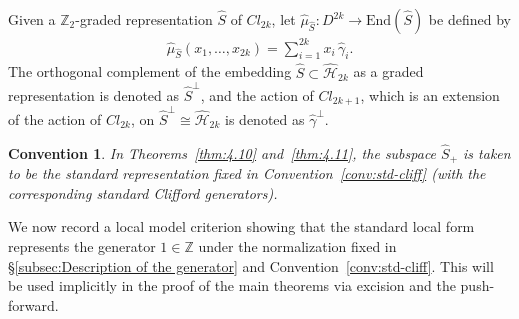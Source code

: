 \documentclass{amsart}
\newtheorem{convention}[thm]{Convention}
\theoremstyle{definition}
\theoremstyle{remark}
\begin{document}
Given a $\mathbb{Z}_2$-graded representation $\hat{S}$ of $Cl_{2k}$, let $\hat{\mu}_{\hat{S}}\colon D^{2k}\to \mathrm{End}(\hat{S})$ be defined by
\begin{align*}
\hat{\mu}_{\hat{S}}(x_1,\dots,x_{2k})=\sum_{i=1}^{2k} x_i\,\hat{\gamma}_i.
\end{align*}
The orthogonal complement of the embedding $\hat{S} \subset \mathcal{\hat{H}}_{2k}$ as a graded representation is denoted as $\hat{S}^{\perp}$, and the action of $Cl_{2k+1}$, which is an extension of the action of $Cl_{2k}$, on $\hat{S}^{\perp} \cong \mathcal{\hat{H}}_{2k}$ is denoted as $\hat{\gamma}^{\perp}$.

\begin{convention}\label{conv:local-model-standard-choice}
In Theorems~\ref{thm:4.10} and~\ref{thm:4.11}, the subspace $\hat{S}_{+}$ is taken to be the standard representation fixed in Convention~\ref{conv:std-cliff} (with the corresponding standard Clifford generators).
\end{convention}

We now record a local model criterion showing that the standard local form represents the generator
$1\in\mathbb Z$ under the normalization fixed in \S\ref{subsec:Description of the generator} and Convention~\ref{conv:std-cliff}.
This will be used implicitly in the proof of the main theorems via excision and the push-forward.
\end{document}
